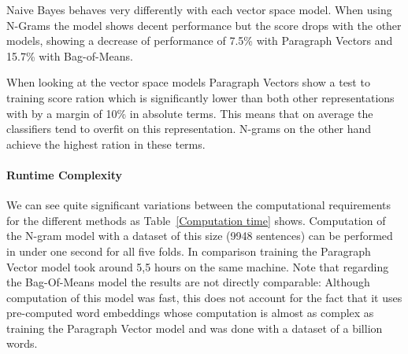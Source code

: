 Naive Bayes behaves very differently with each vector space model. When using N-Grams the model shows decent performance but the score drops with the other models, showing a decrease of performance of 7.5\% with Paragraph Vectors and 15.7\% with Bag-of-Means.

When looking at the vector space models Paragraph Vectors show a test to training score ration which is significantly lower than both other representations with by a margin of 10\% in absolute terms. This means that on average the classifiers tend to overfit on this representation. N-grams on the other hand achieve the highest ration in these terms.


\paragraph{Runtime Complexity}
\label{par:Runtime Complexity}

We can see quite significant variations between the computational requirements for the different methods as Table~\ref{Computation time} shows. Computation of the N-gram model with a dataset of this size (9948 sentences) can be performed in under one second for all five folds. In comparison training the Paragraph Vector model took around 5,5 hours on the same machine. Note that regarding the Bag-Of-Means model the results are not directly comparable: Although computation of this model was fast, this does not account for the fact that it uses pre-computed word embeddings whose computation is almost as complex as training the Paragraph Vector model and was done with a dataset of a billion words.

